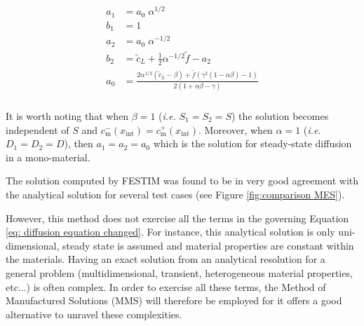 \begin{align}
    \begin{split}
        a_1 &= a_0 \; \alpha^{1/2}  \\
        b_1 &= 1 \\
        a_2 &= a_0 \; \alpha^{-1/2}\\
        b_2 &= \tilde{c}_L + \frac{1}{2} \alpha^{-1/2} \tilde{f} - a_2 \\
        a_0 &= \frac{2 \alpha^{1/2}( \tilde{c}_L - \beta) + \tilde{f}  (\gamma^{2} \left( 1 - \alpha \beta\right) - 1)}{2 \left( 1  + \alpha \beta - \gamma \right)} \\
    \end{split}
    \label{eq: MES c coefficients}
\end{align}

It is worth noting that when $\beta=1$ (\textit{i.e.} $S_1 = S_2 = S$) the solution becomes independent of $S$ and {$c_\mathrm{m}^{-}(x_\mathrm{int}) = c_\mathrm{m}^{+}(x_\mathrm{int})$}.
Moreover, when $\alpha = 1$ (\textit{i.e.} $D_1 = D_2 = D$), then $a_1 = a_2 = a_0$ which is the solution for steady-state diffusion in a mono-material.

The solution computed by FESTIM was found to be in very good agreement with the analytical solution for several test cases (see Figure \ref{fig:comparison MES}).

 
However, this method does not exercise all the terms in the governing Equation \ref{eq: diffusion equation changed}.
For instance, this analytical solution is only uni-dimensional, steady state is assumed and material properties are constant within the materials.
Having an exact solution from an analytical resolution for a general problem (multidimensional, transient, heterogeneous material properties, etc...) is often complex.
In order to exercise all these terms, the Method of Manufactured Solutions (MMS) will therefore be employed for it offers a good alternative to unravel these complexities.


